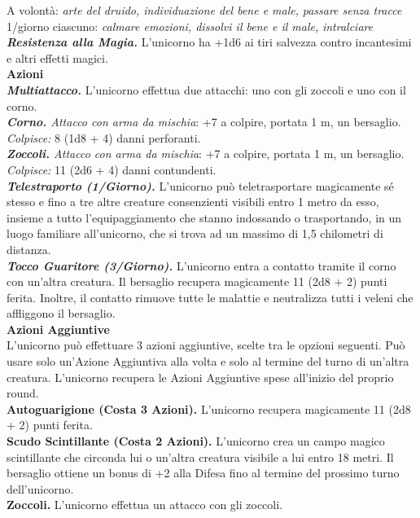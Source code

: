 \begin{multicols}{2}
A volontà: \emph{arte del druido, individuazione del bene e male,} \emph{passare senza tracce}\\
1/giorno ciascuno: \emph{calmare emozioni, dissolvi il bene e il male,} \emph{intralciare}\\
\emph{\textbf{Resistenza alla Magia.}} L'unicorno ha +1d6 ai tiri salvezza contro incantesimi e altri effetti magici.\\
\smallskip\textbf{Azioni}\\
\emph{\textbf{Multiattacco.}} L'unicorno effettua due attacchi: uno con gli zoccoli e uno con il corno.\\
\emph{\textbf{Corno.} Attacco con arma da mischia}: +7 a colpire, portata 1 m, un bersaglio.\\
\emph{Colpisce:} 8 (1d8 + 4) danni perforanti.\\
\emph{\textbf{Zoccoli.} Attacco con arma da mischia}: +7 a colpire, portata 1 m, un bersaglio.\\
\emph{Colpisce:} 11 (2d6 + 4) danni contundenti.\\
\emph{\textbf{Telestraporto (1/Giorno).}} L'unicorno può teletrasportare magicamente sé stesso e fino a tre altre creature consenzienti visibili entro 1 metro da esso, insieme a tutto l'equipaggiamento che stanno indossando o trasportando, in un luogo familiare all'unicorno, che si trova ad un massimo di 1,5 chilometri di distanza.\\
\emph{\textbf{Tocco Guaritore (3/Giorno).}} L'unicorno entra a contatto tramite il corno con un'altra creatura. Il bersaglio recupera magicamente 11 (2d8 + 2) punti ferita. Inoltre, il contatto rimuove tutte le malattie e neutralizza tutti i veleni che affliggono il bersaglio.\\
\textbf{Azioni Aggiuntive}\\
L'unicorno può effettuare 3 azioni aggiuntive, scelte tra le opzioni seguenti. Può usare solo un'Azione Aggiuntiva alla volta e solo al termine del turno di un'altra creatura. L'unicorno recupera le Azioni Aggiuntive spese all'inizio del proprio round.\\
\textbf{Autoguarigione (Costa 3 Azioni).} L'unicorno recupera magicamente 11 (2d8 + 2) punti ferita.\\
\textbf{Scudo Scintillante (Costa 2 Azioni).} L'unicorno crea un campo magico scintillante che circonda lui o un'altra creatura visibile a lui entro 18 metri. Il bersaglio ottiene un bonus di +2 alla Difesa fino al termine del prossimo turno dell'unicorno.\\
\textbf{Zoccoli.} L'unicorno effettua un attacco con gli zoccoli.\\

\end{multicols}
